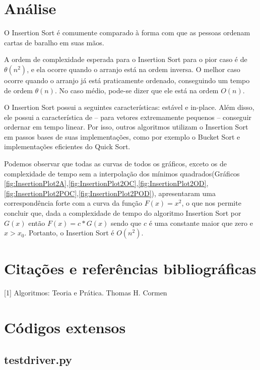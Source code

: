 \documentclass[12pt,a4paper,twoside]{report}
\begin{document}
\chapter{Análise}

O Insertion Sort é comumente comparado à forma com que as pessoas ordenam cartas de baralho em suas mãos.

A ordem de complexidade esperada para o Insertion Sort para o pior caso é de $\theta (n^2)$, e ela ocorre quando o arranjo está na ordem inversa. O melhor caso ocorre quando o arranjo já está praticamente ordenado, conseguindo um tempo de ordem $\theta (n)$. No caso médio, pode-se dizer que ele está na ordem $O(n)$.

O Insertion Sort possui a seguintes características: estável e in-place. Além disso, ele possui a característica de – para vetores extremamente pequenos – conseguir ordernar em tempo linear. Por isso, outros algoritmos utilizam o Insertion Sort em passos bases de suas implementações, como por exemplo o Bucket Sort e implementações eficientes do Quick Sort.

Podemos observar que todas as curvas de todos os gráficos, exceto os de complexidade de tempo sem a interpolação dos mínimos quadrados(Gráficos \ref{fig:InsertionPlot2A},\ref{fig:InsertionPlot2OC},\ref{fig:InsertionPlot2OD},\ref{fig:InsertionPlot2POC},\ref{fig:InsertionPlot2POD}), apresentaram uma correspondência forte com a curva da função $F(x) = x^2$, o que nos permite concluir que, dada a complexidade de tempo do algoritmo Insertion Sort por $G(x)$ então $F(x) = c * G(x)$ sendo que $c$ é uma constante maior que zero e $x > x_0$. Portanto, o Insertion Sort é $O(n^2)$.

\chapter{Citações e referências bibliográficas}
[1] Algoritmos: Teoria e Prática. Thomas H. Cormen
		\date{Today}






\clearpage
{}
\appendix

\chapter{Códigos extensos \label{ap:testdriver}}
\section{testdriver.py}

\end{document}

